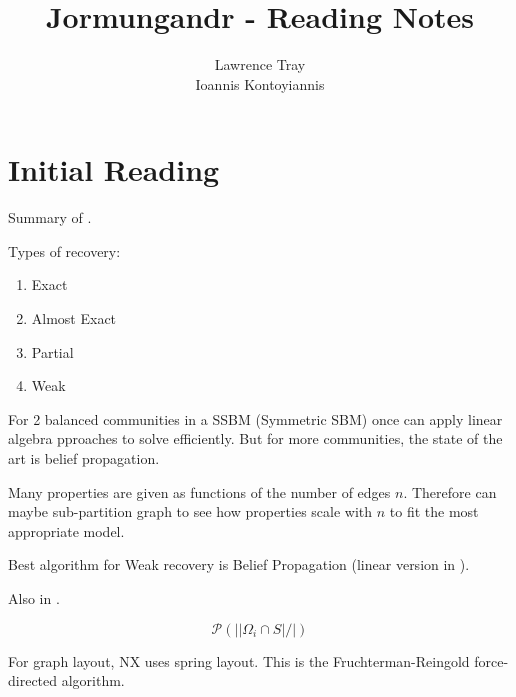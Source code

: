 \documentclass[]{article}
\title{Jormungandr - Reading Notes}
\author{Lawrence Tray \\ Ioannis Kontoyiannis}
\begin{document}
\maketitle

\section{Initial Reading}

Summary of \cite{Abbe}.

Types of recovery:
\begin{enumerate}
	\item Exact
	\item Almost Exact
	\item Partial
	\item Weak
\end{enumerate}

For 2 balanced communities in a SSBM (Symmetric SBM) once can apply linear algebra pproaches to solve efficiently. But for more communities, the state of the art is belief propagation. 

Many properties are given as functions of the number of edges $n$. Therefore can maybe sub-partition graph to see how properties scale with $n$ to fit the most appropriate model.

Best algorithm for Weak recovery is Belief Propagation (linear version in \cite{Linear-ABP}).

Also in \cite{SBM-Achieve}.

\begin{equation}
	\mathcal{P} (||\Omega_i \cap S| / |)
\end{equation}

For graph layout, NX uses spring layout. This is the Fruchterman-Reingold force-directed algorithm.

\nocite{*}
\printbibliography
\end{document}
